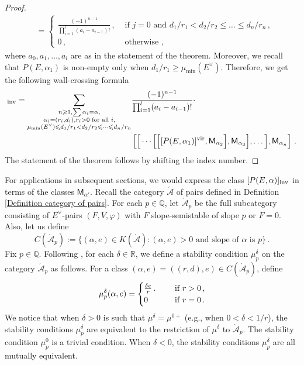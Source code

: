 \documentclass[11pt]{amsart}
\theoremstyle{remark}
\newcommand{\Adash}{\acute{\mathcal{A}}}
\newcommand{\mb}[1]{\mathbb{#1}}
\newcommand{\vp}[0]{\varphi}
\newcommand{\vir}[0]{\textnormal{vir}}
\newcommand{\inv}[0]{\textnormal{inv}}
\newcommand{\sfM}{\mathsf M}
\numberwithin{theorem}{section}
\begin{document}
\begin{proof}
\begin{align*}
        &= \begin{cases}
            \frac{(-1)^{n-1}}{\prod_{i=1}^l (a_i - a_{i-1})!} \,, 
            & \text{ if $j=0$ and } d_1/r_1< d_2/r_2\leqslant \dots \leqslant d_n/r_n \,,\\
            0 \,, & \text{ otherwise ,}
        \end{cases}
    \end{align*}    
    where $a_0,a_1,\dots,a_l$ are as in the statement of the theorem.
    Moreover, we recall that $P(E,\alpha_1)$ is non-empty only when $d_1/r_1 \geqslant \mu_{\min}(E^\vee)$.
    Therefore, we get the following wall-crossing formula
    \begin{align*}
                [Q{(E,\alpha)}]_\inv
                = \sum_{\substack{n \geqslant 1, \sum \alpha_i = \alpha, \\ 
                \alpha_i=(r_i,d_i), r_i>0 \text{ for all }i,\\
                \mu_{\min}(E^\vee) \leqslant d_1/r_1<d_2/r_2\leqslant\cdots\leqslant d_n/r_n}}
                & \frac{(-1)^{n-1}}{\prod_{i=1}^l (a_i - a_{i-1})!} \cdot \\
                &\left[\Big[ \cdots \Big[ \Big[ [P(E,\alpha_1)]^\vir,\sfM_{\alpha_2} \Big], \sfM_{\alpha_3} \Big],\dots \Big],\sfM_{\alpha_n} \right] \,.
            \end{align*}
    The statement of the theorem follows by shifting the index number.
    \end{proof}

For applications in subsequent sections, we would express the class $[P(E,\alpha)]_\inv$ in terms of the classes $\sfM_{\alpha'}$.
Recall the category $\Adash$ of pairs defined in Definition \ref{Definition category of pairs}.
For each $p \in \mb Q$, let $\Adash_p$ be the full subcategory consisting of $E^\vee$-pairs $(F,V,\vp)$ with $F$ slope-semistable of slope $p$ or $F=0$.
Also, let us define 
$$ C(\Adash_p):= \{(\alpha,e) \in K(\Adash): (\alpha,e)>0 \text{ and slope of $\alpha$ is } p\}\,.$$
Fix $p \in \mb Q$. Following \cite[Section 13.2]{JS12}, 
for each $\delta \in \mb R$,
we define a stability condition $\mu_p^\delta$ on the category $\Adash_p$ as follows.
For a class $(\alpha,e) = ((r,d),e)\in C(\Adash_p)$, define
$$ \mu_p^\delta(\alpha,e) = 
\begin{cases}
            \frac{\delta e}{r}\,. \quad  & \textnormal{ if } r>0\,,\\
            0 & \textnormal{ if } r=0\,.
        \end{cases} $$
We notice that when $\delta>0$ is such that $\mu^\delta = \mu^{0+}$ (e.g., when $0 < \delta <1/r$),
the stability conditions $\mu_p^\delta$ are equivalent to the restriction of $\mu^{\delta}$ to $\Adash_p$.
The stability condition $\mu_p^0$ is a trivial condition.
When $\delta<0$, the stability conditions $\mu_p^\delta$ are all mutually equivalent.
\end{document}

